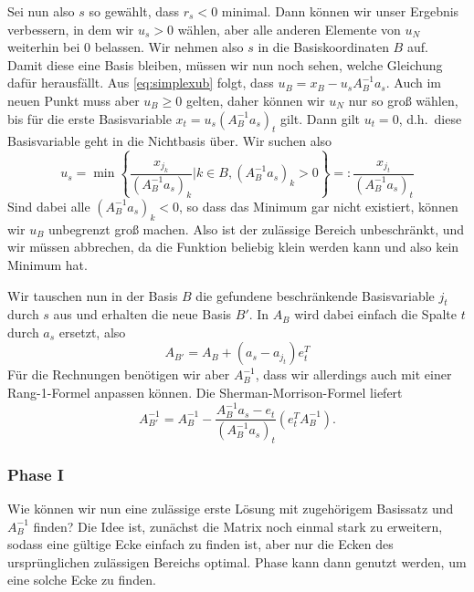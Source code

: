 Sei nun also $s$ so gewählt, dass $r_s< 0$ minimal. Dann können wir
unser Ergebnis verbessern, in dem wir $u_s>0$ wählen, aber alle
anderen Elemente von $u_N$ weiterhin bei 0 belassen. Wir nehmen also
$s$ in die Basiskoordinaten $B$ auf. Damit diese eine Basis bleiben,
müssen wir nun noch sehen, welche Gleichung dafür herausfällt. Aus
\eqref{eq:simplexub} folgt, dass $u_B = x_B - u_s A_B^{-1}a_s$.  Auch
im neuen Punkt muss aber $u_B\ge 0$ gelten, daher können wir $u_N$ nur
so groß wählen, bis für die erste Basisvariable $x_t= u_s
(A_B^{-1}a_s)_t$ gilt. Dann gilt $u_t=0$, d.h.\ diese Basisvariable
geht in die Nichtbasis über.
Wir suchen also
\begin{equation}
  u_s = \min \left\{\frac{x_{j_k}}{(A_B^{-1}a_s)_k} | k\in B,
      (A_B^{-1}a_s)_k > 0\right\} =:
  \frac{x_{j_t}}{(A_B^{-1}a_s)_t}
\end{equation}
Sind dabei alle $(A_B^{-1}a_s)_k < 0$, so dass das Minimum gar nicht
existiert, können wir $u_B$ unbegrenzt groß machen. Also ist der
zulässige Bereich unbeschränkt, und wir müssen abbrechen, da die
Funktion beliebig klein werden kann und also kein Minimum hat.

Wir tauschen nun in der Basis $B$ die gefundene beschränkende
Basisvariable  $j_t$ durch $s$ aus und erhalten die
neue Basis $B'$. In $A_B$ wird dabei einfach die Spalte $t$ durch
$a_s$ ersetzt, also
\begin{equation}
  A_{B'} = A_B + (a_s - a_{j_t})e_t^T
\end{equation}
Für die Rechnungen benötigen wir aber $A_B^{-1}$, dass wir allerdings
auch mit einer Rang-1-Formel anpassen können. Die
Sherman-Morrison-Formel liefert
\begin{equation}
  \label{eq:simplexex}
  A_{B'}^{-1} = A_{B}^{-1} - \frac{A_B^{-1}a_s - e_t}{(A_B^{-1}a_s)_t}
  \left(e_t^TA_{B}^{-1}\right).
\end{equation}

\subsubsection*{Phase I}

Wie können wir nun eine zulässige erste Lösung mit zugehörigem
Basissatz und $A_B^{-1}$ finden? Die Idee ist, zunächst die Matrix
noch einmal stark zu erweitern, sodass eine gültige Ecke einfach zu
finden ist, aber nur die Ecken des ursprünglichen zulässigen Bereichs
optimal. Phase kann dann genutzt werden, um eine solche Ecke zu finden.

